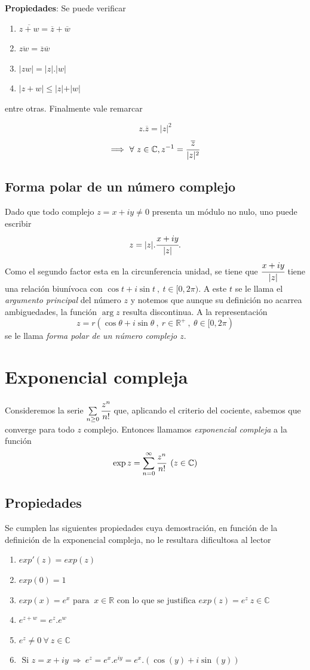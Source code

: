 \documentclass[a4paper,spanish]{article}
\def\C {\mathbb{C}}
\def\R {\mathbb{R}}
\numberwithin{equation}{section}
\begin{document}
\textbf{Propiedades}: Se puede verificar
\begin{enumerate}
\item $\overline{z+w}=\overline{z}+\overline{w}$
\item $\overline{zw}=\overline{z}\overline{w}$
\item $\vert{zw}\vert=\vert {z}\vert.\vert {w}\vert$
\item $\vert {z+w}\vert\leq \vert {z}\vert +\vert {w}\vert$
\end{enumerate}
entre otras. Finalmente vale remarcar

\[z.\overline{z}=\vert{z}\vert^2\]
\[\Longrightarrow \ \forall \ {z} \in \C, z^{-1}=\cfrac{\overline{z}}{\vert{z}\vert^2}\]

\subsection{Forma polar de un n\'umero complejo}
Dado que todo complejo $z=x+iy\neq{0}$ presenta un m\'odulo no
nulo, uno puede escribir
\[z=\vert{z}\vert.\cfrac{x+iy}{\vert{z}\vert}.\] Como el segundo
factor esta en la circunferencia unidad, se tiene que
$\cfrac{x+iy}{\vert{z}\vert}$ tiene una relaci\'on
biun\'ivoca con $\cos{t} + i\sin{t} \ , \ t\in{[0,2\pi)} $. A este $t$
se le llama el \textit{argumento principal} del n\'umero $z$ y
notemos que aunque su definici\'on no acarrea ambiguedades, la
funci\'on $\arg {z} $ resulta discontinua. A la representaci\'on
\[z=r(\cos{\theta}+i\sin{\theta} \ , \ r \in \R^+ \ , \ \theta \in
[0,2 \pi)\] se le llama \textit{forma polar de un n\'umero complejo $z$}.


\section{Exponencial compleja}

Consideremos la serie $\sum\limits_{n\geq{0}} \cfrac{z^n}{n!} $ que, aplicando el criterio del cociente, sabemos que converge para todo $z$ complejo.
Entonces llamamos \textit{exponencial compleja} a la funci\'on \\
\[ \exp{z}= \sum_{n=0} ^{\infty} \cfrac{z^n}{n!} \ \left( z \in \C \right) \]

\subsection{Propiedades}
Se cumplen las siguientes propiedades cuya demostraci\'on, en funci\'on de la definici\'on de la exponencial compleja, no le resultara dificultosa al lector
\begin{enumerate}

\item $exp'(z) = exp (z)$ 
\item $ exp (0) = 1 $
\item $ exp (x)= e^{x} \mbox{ para } \ x \in \R \mbox{  con lo que se justifica } exp (z) = e^{z} \ z \in \C $
\item $ e^{z+w}= e^{z}.e^{w}$
\item $ e^{z} \neq 0 \ \forall \ z \in \C$
\item $ \mbox{ Si } z= x+iy \ \Longrightarrow \ e^{z} = e^{x}.e^{iy} = e^{x}.(\cos(y)+i\sin(y))$

\end{enumerate}
\end{document}

